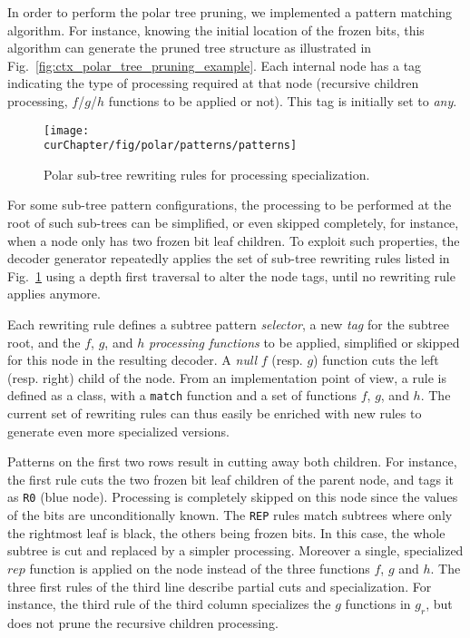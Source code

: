 In order to perform the polar tree pruning, we implemented a pattern matching
algorithm. For instance, knowing the initial location of the frozen bits, this
algorithm can generate the pruned tree structure as illustrated in
Fig.~\ref{fig:ctx_polar_tree_pruning_example}. Each internal node has a tag
indicating the type of processing required at that node (recursive children
processing, $f$/$g$/$h$ functions to be applied or not). This tag is initially
set to \emph{any}.

\begin{figure}[htp]
  \centering
  \texttt{[image: \\curChapter/fig/polar/patterns/patterns]}
  \caption{Polar sub-tree rewriting rules for processing specialization.}
  \label{fig:opt_polar_patterns}
\end{figure}

For some sub-tree pattern configurations, the processing to be performed at the
root of such sub-trees can be simplified, or even skipped completely, for
instance, when a node only has two frozen bit leaf children. To exploit such
properties, the decoder generator repeatedly applies the set of sub-tree
rewriting rules listed in Fig.~\ref{fig:opt_polar_patterns} using a depth first
traversal to alter the node tags, until no rewriting rule applies anymore.

Each rewriting rule defines a subtree pattern \emph{selector}, a new \emph{tag}
for the subtree root, and the $f$, $g$, and $h$ \emph{processing functions} to
be applied, simplified or skipped for this node in the resulting decoder. A
\emph{null} $f$ (resp. $g$) function cuts the left (resp. right) child of the
node. From an implementation point of view, a rule is defined as a class, with a
\verb|match| function and a set of functions $f$, $g$, and $h$. The current
set of rewriting rules can thus easily be enriched with new rules to generate
even more specialized versions.

Patterns on the first two rows result in cutting away both children. For
instance, the first rule cuts the two frozen bit leaf children of the parent
node, and tags it as \verb|R0| (blue node). Processing is completely skipped on
this node since the values of the bits are unconditionally known. The \verb|REP|
rules match subtrees where only the rightmost leaf is black, the others being
frozen bits. In this case, the whole subtree is cut and replaced by a simpler
processing. Moreover a single, specialized $rep$ function is applied on the node
instead of the three functions $f$, $g$ and $h$. The three first rules of the
third line describe partial cuts and specialization. For instance, the third
rule of the third column specializes the $g$ functions in $g_r$, but does not
prune the recursive children processing.

